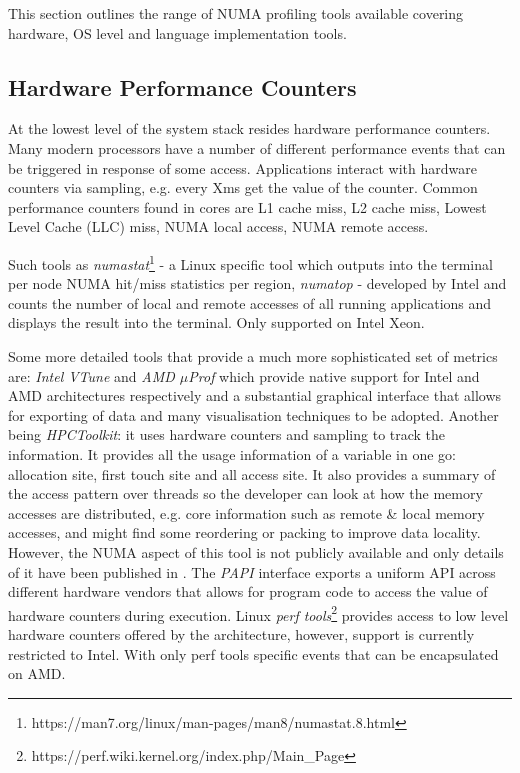 \documentclass{paper}\usepackage{graphicx}
\begin{document}
This section outlines the range of NUMA profiling tools available covering hardware, OS level and language implementation tools.

\subsection{Hardware Performance Counters}
\label{sec:existing}

At the lowest level of the system stack resides hardware performance counters. Many modern processors have a number of different performance events that can be triggered in response of some access.  Applications interact with hardware counters via sampling, e.g. every Xms get the value of the counter. Common performance counters found in cores are L1 cache miss, L2 cache miss, Lowest Level Cache (LLC) miss, NUMA local access, NUMA remote access.

Such tools as \textit{numastat}\footnote{https://man7.org/linux/man-pages/man8/numastat.8.html} - a Linux specific tool which outputs into the terminal per node NUMA hit/miss statistics per region, \textit{numatop} - developed by Intel and counts the number of local and remote accesses of all running applications and displays the result into the terminal. Only supported on Intel Xeon.

Some more detailed tools that provide a much more sophisticated set of metrics are: \textit{Intel VTune} and \textit{AMD $\mu$Prof} which provide native support for Intel and AMD architectures respectively and a substantial graphical interface that allows for exporting of data and many visualisation techniques to be adopted. Another being \textit{HPCToolkit}: it uses hardware counters and sampling to track the information. It provides all the usage information of a variable in one go: allocation site, first touch site and all access site. It also provides a summary of the access pattern over threads so the developer can look at how the memory accesses are distributed, e.g. core information such as remote \& local memory accesses, and might find some reordering or packing to improve data locality. However, the NUMA aspect of this tool is not publicly available and only details of it have been published in \cite{DBLP:conf/ppopp/LiuM14}. The \textit{PAPI} interface\cite{DBLP:conf/ptw/TerpstraJYD09} exports a uniform API across different hardware vendors that allows for program code to access the value of hardware counters during execution. Linux \textit{perf
tools}\footnote{\label{perf}https://perf.wiki.kernel.org/index.php/Main\_Page} provides access to low level hardware counters offered by the architecture, however, support is currently restricted to Intel. With only perf tools specific events that can be encapsulated on AMD.
\end{document}
